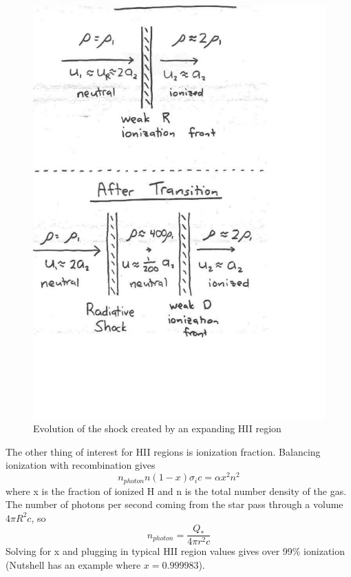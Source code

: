 \begin{figure}[!h]
\begin{center}
\includegraphics[width=\textwidth]{shock_diagram.pdf}
\end{center}
\caption{Evolution of the shock created by an expanding HII region \label{fig:front}}
\end{figure}

The other thing of interest for HII regions is ionization fraction.  Balancing ionization with 
recombination gives
\begin{equation}
n_{photon}n(1-x)\sigma_{i}c=\alpha x^2n^2
\end{equation}
where x is the fraction of ionized H and n is the total number density of the gas.  The number 
of photons per second coming from the star pass through a volume $4\pi R^2c$, so 
\begin{equation}
n_{photon}=\frac{Q_*}{4\pi r^2c}
\end{equation}
Solving for x and plugging in typical HII region values gives over 99\% ionization (Nutshell 
has an example where $x=0.999983$).  

